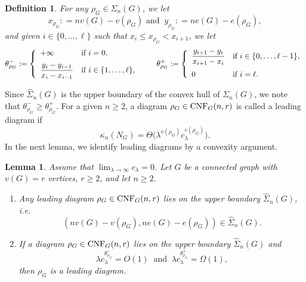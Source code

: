 \documentclass[12pt]{article}
\newtheorem{lemma}[prop]{Lemma}
\newtheorem{definition}[prop]{Definition}
\numberwithin{equation}{section}
\begin{document}
\begin{definition}
 For any $\rho_G \in \Sigma_n(G)$, we let 
$$
 x_{\rho_G} : = nv(G)-v(\rho_G) \mbox{ and }
 \ 
 y_{\rho_G} : = ne(G)-e(\rho_G), 
$$ 
 and given $i\in \{0,\ldots , \ell \}$ such that
 $x_i\le x_{\rho_G} <x_{i+1}$, we let 
 $$
 \theta^-_{\rho_G} : = \left\{
 \begin{array}{ll}
   +\infty & \mbox{if } i=0,
   \medskip
   \\ 
   \displaystyle
   \frac{y_i-y_{i-1}}{x_i-x_{i-1}} & \mbox{if } i\in \{1,\ldots , \ell \}, 
 \end{array}
 \right.
 \qquad 
 \theta^+_{\rho_G} : = 
 \left\{
 \begin{array}{ll}
   \displaystyle
   \frac{y_{i+1}-y_i}{x_{i+1}-x_i}
   & \mbox{if } i\in \{0,\ldots ,  \ell - 1\}, 
   \medskip
   \\ 
   0 & \mbox{if } i=\ell. 
 \end{array}
 \right.
$$ 
\end{definition} 
Since $\widehat{\Sigma}_n(G)$ is the
upper boundary of
the convex hull of $\Sigma_n(G)$, we note that
$\theta^-_{\rho_G} \geq \theta^+_{\rho_G}$.
 For a given $n\ge2$, a diagram $\rho_G\in {\rm CNF}_G(n,r)$
 is called a leading diagram if 
\begin{equation}\label{asy-2}
\kappa_n(N_G)=\Theta\big(\lambda^{v(\rho_G)}c_\lambda^{e(\rho_G)}\big). 
\end{equation}
 In the next lemma, we identify leading diagrams
 by a convexity argument. 
\begin{lemma}\label{lm:slope}
  Assume that $\lim_{\lambda \to \infty} c_\lambda =0$.
  Let $G$ be a connected graph with $v(G)=r$ vertices, $r\ge2$, and
  let $n\ge2$. 
  \begin{enumerate}[1)]
  \item
    Any leading diagram $\rho_G\in {\rm CNF}_G(n,r)$ lies on the
    upper boundary $\widehat{\Sigma}_n(G)$, i.e. 
  $$
  (nv(G)-v(\rho_G),ne(G)-e(\rho_G)) \in \widehat{\Sigma}_n(G).
  $$
 \item
  If a diagram $\rho_G\in {\rm CNF}_G(n,r)$ lies on the
  upper boundary $\widehat{\Sigma}_n(G)$ and 
  \begin{equation}
    \label{fjk5lf4} 
  \lambda c_\lambda^{ \theta^-_{\rho_G}}=O(1) \ \mbox{ and } \
  \lambda c_\lambda^{ \theta^+_{\rho_G} }=\Omega(1), 
\end{equation}
 then $\rho_G$ is a leading diagram.
\end{enumerate}
\end{lemma}
\end{document}
